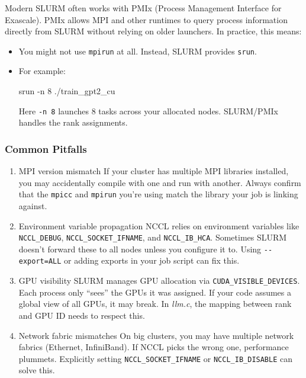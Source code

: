 \documentclass[
  letterpaper,
  DIV=11,
  numbers=noendperiod]{scrreprt}
\newenvironment{Shaded}{\begin{snugshade}}{\end{snugshade}}
\newcommand{\AttributeTok}[1]{\textcolor[rgb]{0.40,0.45,0.13}{#1}}
\newcommand{\ExtensionTok}[1]{\textcolor[rgb]{0.00,0.23,0.31}{#1}}
\newcommand{\NormalTok}[1]{\textcolor[rgb]{0.00,0.23,0.31}{#1}}
\begin{document}
Modern SLURM often works with PMIx (Process Management Interface for
Exascale). PMIx allows MPI and other runtimes to query process
information directly from SLURM without relying on older launchers. In
practice, this means:

\begin{itemize}
\item
  You might not use \texttt{mpirun} at all. Instead, SLURM provides
  \texttt{srun}.
\item
  For example:

\begin{Shaded}
\begin{Highlighting}[]
\ExtensionTok{srun} \AttributeTok{{-}n}\NormalTok{ 8 ./train\_gpt2\_cu}
\end{Highlighting}
\end{Shaded}

  Here \texttt{-n\ 8} launches 8 tasks across your allocated nodes.
  SLURM/PMIx handles the rank assignments.
\end{itemize}

\subsubsection{Common Pitfalls}\label{common-pitfalls-2}

\begin{enumerate}
\def\labelenumi{\arabic{enumi}.}
\item
  MPI version mismatch If your cluster has multiple MPI libraries
  installed, you may accidentally compile with one and run with another.
  Always confirm that the \texttt{mpicc} and \texttt{mpirun} you're
  using match the library your job is linking against.
\item
  Environment variable propagation NCCL relies on environment variables
  like \texttt{NCCL\_DEBUG}, \texttt{NCCL\_SOCKET\_IFNAME}, and
  \texttt{NCCL\_IB\_HCA}. Sometimes SLURM doesn't forward these to all
  nodes unless you configure it to. Using \texttt{-\/-export=ALL} or
  adding exports in your job script can fix this.
\item
  GPU visibility SLURM manages GPU allocation via
  \texttt{CUDA\_VISIBLE\_DEVICES}. Each process only ``sees'' the GPUs
  it was assigned. If your code assumes a global view of all GPUs, it
  may break. In \emph{llm.c}, the mapping between rank and GPU ID needs
  to respect this.
\item
  Network fabric mismatches On big clusters, you may have multiple
  network fabrics (Ethernet, InfiniBand). If NCCL picks the wrong one,
  performance plummets. Explicitly setting \texttt{NCCL\_SOCKET\_IFNAME}
  or \texttt{NCCL\_IB\_DISABLE} can solve this.
\end{enumerate}
\end{document}
